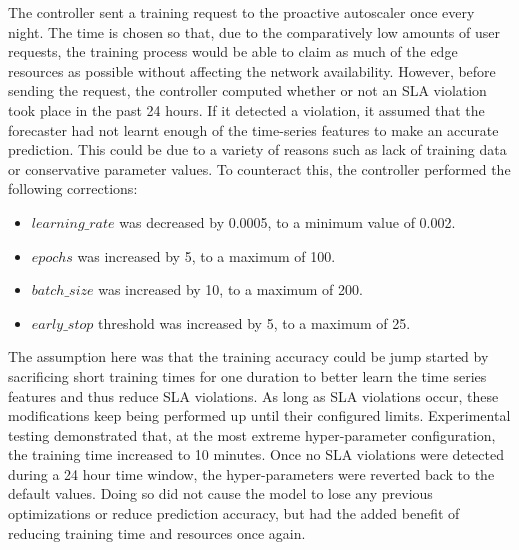 The controller sent a training request to the proactive autoscaler once every night. The time is chosen so that, due to the comparatively low amounts of user requests, the training process would be able to claim as much of the edge resources as possible without affecting the network availability. However, before sending the request, the controller computed whether or not an SLA violation took place in the past 24 hours. If it detected a violation, it assumed that the forecaster had not learnt enough of the time-series features to make an accurate prediction. This could be due to a variety of reasons such as lack of training data or conservative parameter values. To counteract this, the controller performed the following corrections:
\enlargethispage{\baselineskip}
\begin{itemize}
    \item $learning\_rate$ was decreased by 0.0005, to a minimum value of 0.002.
    \item $epochs$ was increased by 5, to a maximum of 100.
    \item $batch\_size$ was increased by 10, to a maximum of 200.
    \item $early\_stop$ threshold was increased by 5, to a maximum of 25.
\end{itemize}

The assumption here was that the training accuracy could be jump started by sacrificing short training times for one duration to better learn the time series features and thus reduce SLA violations. As long as SLA violations occur, these modifications keep being performed up until their configured limits. Experimental testing demonstrated that, at the most extreme hyper-parameter configuration, the training time increased to 10 minutes. Once no SLA violations were detected during a 24 hour time window, the hyper-parameters were reverted back to the default values. Doing so did not cause the model to lose any previous optimizations or reduce prediction accuracy, but had the added benefit of reducing training time and resources once again.